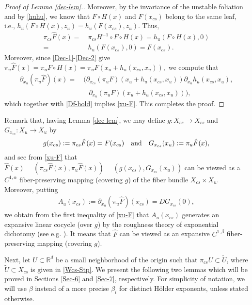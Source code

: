 \documentclass[reqno]{amsart}
\numberwithin{equation}{section}
\begin{document}
\begin{proof}[Proof of Lemma {\rm \ref{dec-lem}.}]
Moreover, by the invariance of the unstable foliation and by \eqref{huhu}, we know that $F\circ H(x)$
and $F(x_{cs})$ belong to the same leaf, i.e.,
$
h_u(F\circ H(x),z_u)=h_u(F(x_{cs}),z_u).
$
Thus,
\begin{align*}
\pi_{cs}\hat F(x)=&~\pi_{cs}H^{-1} \circ F \circ H(x) =h_u(F \circ H(x),0)
\\
=&~ h_u(F(x_{cs}),0)=F(x_{cs}).
\end{align*}
Moreover, since \eqref{Dec-1}-\eqref{Dec-2} give
$
\pi_{u}\hat F(x)=\pi_{u}F \circ H(x)=\pi_{u}F(x_u+ h_u(x_{cs}, x_u)),
$
we compute that
\begin{align*}
\partial_{x_u} (\pi_{u}\hat F)(x)=&~ \Big(\partial_{x_{cs}}(\pi_{u}F)(x_u+ h_u(x_{cs}, x_u))\partial_{x_u} h_u(x_{cs}, x_u),
\\
&\quad  \partial_{x_u}(\pi_{u}F)(x_u+ h_u(x_{cs}, x_u))\Big),
\end{align*}
which together with \eqref{Df-hold} implies \eqref{xu-F}.
This completes the proof.
\end{proof}

Remark that, having Lemma \ref{dec-lem}, we may
define $g:X_{cs}\to X_{cs}$ and $G_{x_{cs}}:X_u\to X_u$ by
\begin{align}\label{gg-GG}
g(x_{cs}):=\pi_{cs} \hat F(x)=F(x_{cs})\quad {\rm and}\quad G_{x_{cs}}(x_u):=\pi_u \hat F(x),
\end{align}
and see from \eqref{xu-F} that
$\hat F(x)=(\pi_{cs}\hat F(x),\pi_u\hat F(x))=(g(x_{cs}), G_{x_{cs}}(x_u))$
can be viewed as a $C^{1,\alpha}$ fiber-preserving mapping (covering $g$) of the fiber bundle $X_{cs}\times X_u$.
Moreover, putting
\begin{align}\label{def-Au}
A_u(x_{cs}):=\partial_{x_u}(\pi_u \hat F)(x_{cs})=DG_{x_{cs}}(0),
\end{align}
we obtain from the first inequality of \eqref{xu-F} that $A_u(x_{cs})$ generates an expansive linear cocycle (over $g$) by the roughness theory of exponential dichotomy (see e.g. \cite{Henry-Book, ZLZ-JDE}). It means that $\hat F$ can be viewed as an expansive $C^{1,\beta}$ fiber-preserving mapping (covering $g$).

Next, let $U\subset \mathbb{R}^d$ be a small neighborhood of the origin such that $\pi_{cs}U\subset \tilde U$, where $\tilde U\subset X_{cs}$ is given in \eqref{Wcs-Stp}. We present the following two lemmas which will be proved in Sections \ref{Sec-6} and \ref{Sec-7}, respectively.
For simplicity of notation, we will use $\beta$ instead of a more precise $\beta_i$ for distinct H\"older exponents, unless stated otherwise.
\end{document}
